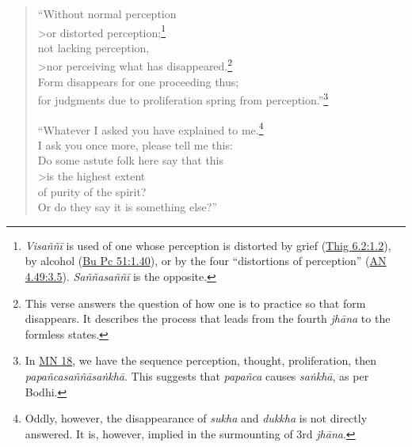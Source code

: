 \documentclass[12pt,openany]{book}%
\begin{document}
\begin{verse}
“Without normal perception \\>or distorted perception;\footnote{\textit{\textsanskrit{Visaññī}} is used of one whose perception is distorted by grief (\href{https://suttacentral.net/thig6.2/en/sujato\#1.2}{Thig 6.2:1.2}), by alcohol (\href{https://suttacentral.net/pli-tv-bu-vb-pc51/en/sujato\#1.40}{Bu Pc 51:1.40}), or by the four “distortions of perception” (\href{https://suttacentral.net/an4.49/en/sujato\#3.5}{AN 4.49:3.5}). \textit{\textsanskrit{Saññasaññī}} is the opposite. } \\
not lacking perception, \\>nor perceiving what has disappeared.\footnote{This verse answers the question of how one is to practice so that form disappears. It describes the process that leads from the fourth \textit{\textsanskrit{jhāna}} to the formless states. } \\
Form disappears for one proceeding thus; \\
for judgments due to proliferation spring from perception.”\footnote{In \href{https://suttacentral.net/mn18/en/sujato}{MN 18}, we have the sequence perception, thought, proliferation, then \textit{\textsanskrit{papañcasaññāsaṅkhā}}. This suggests that \textit{\textsanskrit{papañca}} causes \textit{\textsanskrit{saṅkhā}}, as per Bodhi. } 

“Whatever I asked you have explained to me.\footnote{Oddly, however, the disappearance of \textit{sukha} and \textit{dukkha} is not directly answered. It is, however, implied in the surmounting of 3rd \textit{\textsanskrit{jhāna}}. } \\
I ask you once more, please tell me this: \\
Do some astute folk here say that this \\>is the highest extent \\
of purity of the spirit? \\
Or do they say it is something else?” 


\end{verse}
\end{document}
